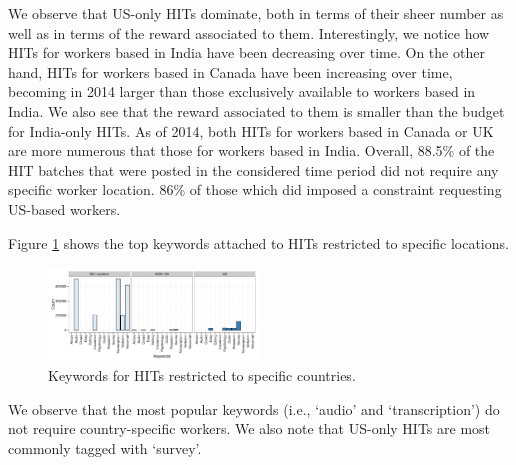 We observe that US-only HITs dominate, both in terms of their sheer number as well as in terms of the reward associated to them. 
Interestingly, we notice how HITs for workers based in India have been decreasing over time. %
On the other hand, HITs for workers based in Canada have been increasing over time, becoming in 2014 larger than those exclusively available to workers based in India.  We also see that the reward associated to them is smaller than the budget for India-only HITs.
As of 2014, both HITs for workers based in Canada or UK are more numerous that those for workers based in India.
Overall, 88.5\% of the HIT batches that were posted in the considered time period did not require any specific worker location. 86\% of those which did imposed a constraint requesting US-based workers.


Figure \ref{fig:keyword_loc} shows the top keywords attached to HITs restricted to specific locations.
\begin{figure}[tb]
	\centering
		\includegraphics[width=0.5\textwidth]{figures/keywords_location}
	\caption{Keywords for HITs restricted to specific countries.}
	\label{fig:keyword_loc}
\end{figure}
We observe that the most popular keywords (i.e., `audio' and `transcription') do not require country-specific workers. 
We also note that US-only HITs are most commonly tagged with `survey'.


